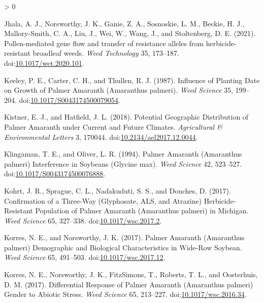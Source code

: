 \documentclass[utf8]{frontiersSCNS}
\newlength{\cslhangindent}
\newenvironment{CSLReferences}[2] %
 {%
  \setlength{\parindent}{0pt}
  \ifodd #1 \everypar{\setlength{\hangindent}{\cslhangindent}}\ignorespaces\fi
  \ifnum #2 > 0
  \setlength{\parskip}{#2\baselineskip}
  \fi
 }%
 {}
\begin{document}
\begin{CSLReferences}{1}{0}
\leavevmode\hypertarget{ref-jhala2021}{}%
Jhala, A. J., Norsworthy, J. K., Ganie, Z. A., Sosnoskie, L. M., Beckie,
H. J., Mallory-Smith, C. A., Liu, J., Wei, W., Wang, J., and
Stoltenberg, D. E. (2021). Pollen-mediated gene flow and transfer of
resistance alleles from herbicide-resistant broadleaf weeds. \emph{Weed
Technology} 35, 173--187.
doi:\href{https://doi.org/10.1017/wet.2020.101}{10.1017/wet.2020.101}.

\leavevmode\hypertarget{ref-keeley1987}{}%
Keeley, P. E., Carter, C. H., and Thullen, R. J. (1987). Influence of
{Planting Date} on {Growth} of {Palmer Amaranth} ({Amaranthus} palmeri).
\emph{Weed Science} 35, 199--204.
doi:\href{https://doi.org/10.1017/S0043174500079054}{10.1017/S0043174500079054}.

\leavevmode\hypertarget{ref-kistner2018}{}%
Kistner, E. J., and Hatfield, J. L. (2018). Potential {Geographic
Distribution} of {Palmer Amaranth} under {Current} and {Future
Climates}. \emph{Agricultural \& Environmental Letters} 3, 170044.
doi:\href{https://doi.org/10.2134/ael2017.12.0044}{10.2134/ael2017.12.0044}.

\leavevmode\hypertarget{ref-klingaman1994}{}%
Klingaman, T. E., and Oliver, L. R. (1994). Palmer {Amaranth}
({Amaranthus} palmeri) {Interference} in {Soybeans} ({Glycine} max).
\emph{Weed Science} 42, 523--527.
doi:\href{https://doi.org/10.1017/S0043174500076888}{10.1017/S0043174500076888}.

\leavevmode\hypertarget{ref-kohrt2017}{}%
Kohrt, J. R., Sprague, C. L., Nadakuduti, S. S., and Douches, D. (2017).
Confirmation of a {Three}-{Way} ({Glyphosate}, {ALS}, and {Atrazine})
{Herbicide}-{Resistant Population} of {Palmer Amaranth} ({Amaranthus}
palmeri) in {Michigan}. \emph{Weed Science} 65, 327--338.
doi:\href{https://doi.org/10.1017/wsc.2017.2}{10.1017/wsc.2017.2}.

\leavevmode\hypertarget{ref-korres2017a}{}%
Korres, N. E., and Norsworthy, J. K. (2017). Palmer {Amaranth}
({Amaranthus} palmeri) {Demographic} and {Biological Characteristics} in
{Wide}-{Row Soybean}. \emph{Weed Science} 65, 491--503.
doi:\href{https://doi.org/10.1017/wsc.2017.12}{10.1017/wsc.2017.12}.

\leavevmode\hypertarget{ref-korres2017}{}%
Korres, N. E., Norsworthy, J. K., FitzSimons, T., Roberts, T. L., and
Oosterhuis, D. M. (2017). Differential {Response} of {Palmer Amaranth}
({Amaranthus} palmeri) {Gender} to {Abiotic Stress}. \emph{Weed Science}
65, 213--227.
doi:\href{https://doi.org/10.1017/wsc.2016.34}{10.1017/wsc.2016.34}.


\end{CSLReferences}
\end{document}
